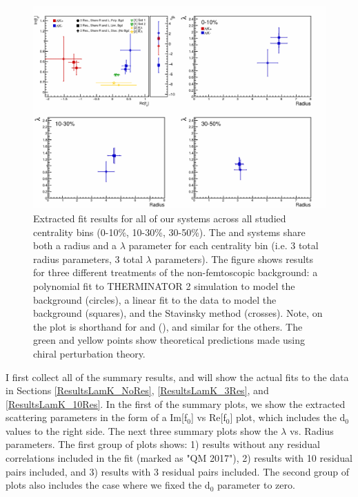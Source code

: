 \documentclass[../AnalysisNoteJBuxton.tex]{subfiles}
\begin{document}
\begin{figure}[h]
  \centering
  \includegraphics[width=\textwidth]{7_ResultsAndDiscussion/Figures/CompareAllScattParams_ShareR_Sharelam.pdf}
  \caption[Fit Results: Shared Radii and THERMINATOR 2 Background]{Extracted fit results for all of our \LamALamKpm systems across all studied centrality bins (0-10\%, 10-30\%, 30-50\%).  The \LamKchPALamKchM and \LamKchMALamKchP systems share both a radius and a $\lambda$ parameter for each centrality bin (i.e. 3 total radius parameters, 3 total $\lambda$ parameters).  The figure shows results for three different treatments of the non-femtoscopic background: a polynomial fit to THERMINATOR 2 simulation to model the background (circles), a linear fit to the data to model the background (squares), and the Stavinsky method (crosses).  Note, \LamKchP on the plot is shorthand for \LamKchP and \ALamKchM (\LamKchPALamKchM), and similar for the others.  The green \cite{Liu:2006xja} and yellow \cite{Mai:2009ce} points show theoretical predictions made using chiral perturbation theory.}
  \label{fig:FitResults_ShareR_Sharelam_PolyBgd}
\end{figure}



I first collect all of the summary results, and will show the actual fits to the data in Sections \ref{ResultsLamK_NoRes}, \ref{ResultsLamK_3Res}, and \ref{ResultsLamK_10Res}.  In the first of the summary plots, we show the extracted scattering parameters in the form of a Im[f$_{0}$] vs Re[f$_{0}$] plot, which includes the d$_{0}$ values to the right side.  The next three summary plots show the $\lambda$ vs. Radius parameters.  The first group of plots shows: 1) results without any residual correlations included in the fit (marked as "QM 2017"), 2) results with 10 residual pairs included, and 3) results with 3 residual pairs included.  The second group of plots also includes the case where we fixed the d$_{0}$ parameter to zero.
\end{document}
